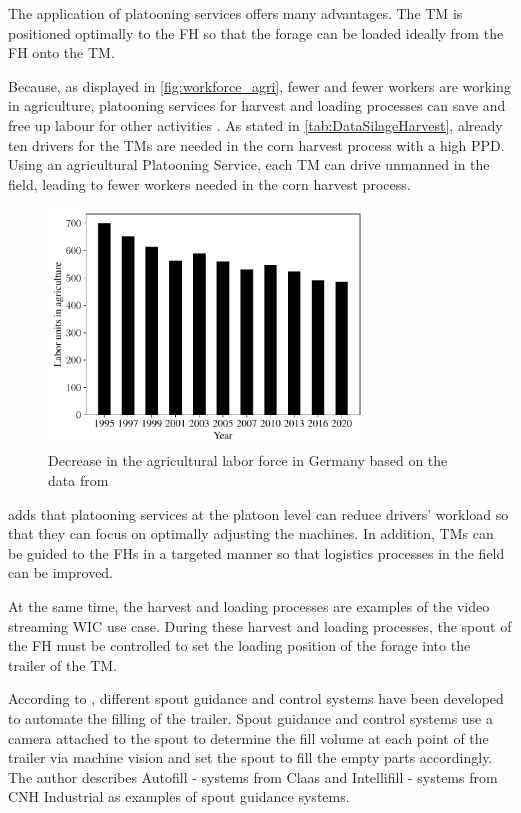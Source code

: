 The application of platooning services offers many advantages.
The \ac{TM} is positioned optimally to the \ac{FH} so that the forage can be loaded ideally from the \ac{FH} onto the \ac{TM}.

Because, as displayed in \autoref{fig:workforce_agri}, fewer and fewer workers are working in agriculture, platooning services for harvest and loading processes can save and free up labour for other activities \cite{liu_automation_2022}. As stated in \autoref{tab:DataSilageHarvest}, already ten drivers for the \ac{TM}s are needed in the corn harvest process with a high \ac{PPD}. Using an agricultural Platooning Service, each \ac{TM} can drive unmanned in the field, leading to fewer workers needed in the corn harvest process.

\begin{figure}[H]
	\centering
	\includegraphics[width=0.75\textwidth]{figures/WorkForceAgriculture.pdf}
	\caption{Decrease in the agricultural labor force in Germany based on the data from \cite{bmel2020}}%
	\label{fig:workforce_agri}%
\end{figure}

\textcite{smolnik_5g_2020} adds that platooning services at the platoon level can reduce drivers' workload so that they can focus on optimally adjusting the machines.
In addition, \ac{TM}s can be guided to the \ac{FH}s in a targeted manner so that logistics processes in the field can be improved.

At the same time, the harvest and loading processes are examples of the video streaming \ac{WIC} use case. During these harvest and loading processes, the spout of the \ac{FH} must be controlled to set the loading position of the forage into the trailer of the \ac{TM}.

According to \textcite{murcia_quadrotor_2014}, different spout guidance and control systems have been developed to automate the filling of the trailer. Spout guidance and control systems use a camera attached to the spout to determine the fill volume at each point of the trailer via machine vision and set the spout to fill the empty parts accordingly. The author describes Autofill - systems from Claas and Intellifill - systems from CNH Industrial as examples of spout guidance systems.

